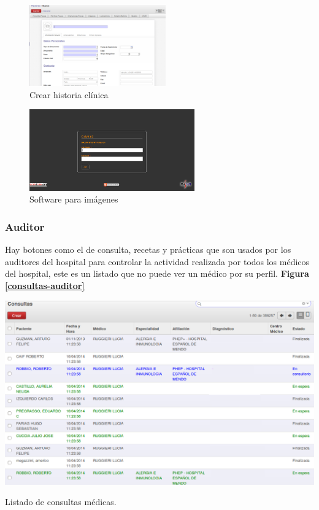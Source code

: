 \begin{correccionFigure}[h]
      \centering
      \begin{subfigure}[t]{0.48\textwidth}
        \includegraphics[height=3.5cm]{img/tp1/HE/HCUD2}
        \caption{Crear historia clínica}
        \label{hc-nueva}
      \end{subfigure}
      \hfill%
      \begin{subfigure}[t]{0.548\textwidth}
        \includegraphics[height=3.5cm]{img/tp1/HE/Imagenes}
        \caption{Software para imágenes}
        \label{sw-imagen}
	  \end{subfigure}
\end{correccionFigure}

{\correccionTexto
\subsubsection{Auditor}
Hay botones como el de consulta, recetas y prácticas que son usados por los auditores del hospital para controlar la actividad realizada por todos los médicos del hospital, este es un listado que no puede ver un médico por su perfil. \textbf{Figura \ref{consultas-auditor}}
}

\begin{correccionFigure}[h]
      \centering
      \includegraphics[width=.8\textwidth]{img/tp1/HE/HCUDConsulta}
      \caption{Listado de consultas médicas.}
      \label{consultas-auditor}
\end{correccionFigure}

